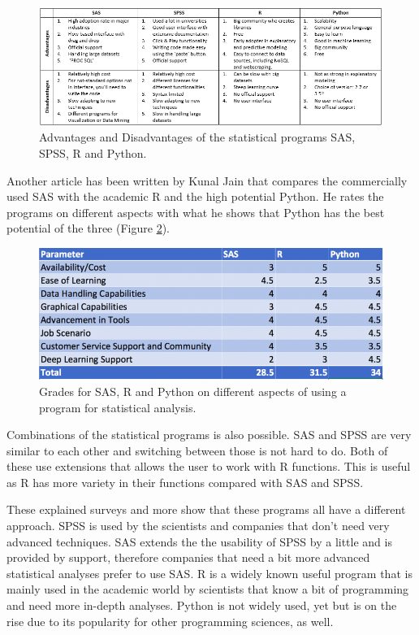 \documentclass[10pt,a4paper]{report}
\begin{document}
	\begin{figure}[h!]
		\includegraphics[width=\textwidth]{StatProgComp.PNG}
		\caption{Advantages and Disadvantages of the statistical programs SAS, 
			SPSS, R and Python.\cite{BlogKromme2017}}
		\label{fig:StatProgComp}
	\end{figure}
	
	Another article has been written by Kunal Jain that compares the 
	commercially used SAS with the academic R and the high potential Python. 
	He rates the programs on different aspects with what he shows that Python 
	has the best potential of the three (Figure 
	\ref{fig:StatProgGrades}).\cite{BlogJain2017}
	
	\begin{figure}[h!]
		\includegraphics[width=\textwidth]{StatProgGrades.PNG}
		\caption{Grades for SAS, R and Python on different aspects of using a 
			program for statistical analysis.\cite{BlogJain2017}}
		\label{fig:StatProgGrades}
	\end{figure}
	
	Combinations of the statistical programs is also possible. SAS and SPSS are 
	very similar to each other and switching between those is 
	not hard to do. Both of these use extensions that allows the user to work 
	with R functions. This is useful as R has more variety in their functions 
	compared with SAS and SPSS.
	\cite{muenchen2011r}
	
	These explained surveys and more \cite{BlogWillems2014} 
	\cite{BlogSupport2017} show that these programs all have a different 
	approach. SPSS is used by the scientists and companies that don't need very 
	advanced techniques. SAS extends the the usability of SPSS by a little and 
	is provided by support, therefore companies that need a bit more advanced 
	statistical analyses prefer to use SAS. R is a widely known useful program 
	that is mainly used in the academic world by scientists that know a bit of 
	programming and need more in-depth analyses. Python is not widely used, yet 
	but is on the rise due to its popularity for other programming sciences, as 
	well.
	
\end{document}
